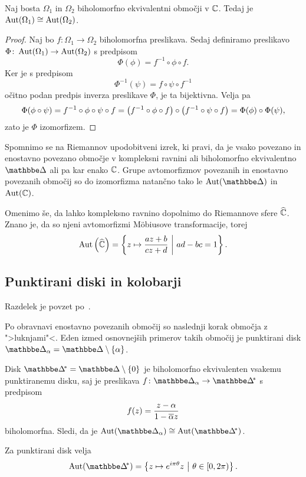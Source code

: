 \begin{lema}
Naj bosta $\Omega_1$ in $\Omega_2$ biholomorfno ekvivalentni
območji v $\mathbb{C}$. Tedaj je $\operatorname{Aut}(\Omega_1) \cong \operatorname{Aut}(\Omega_2)$.
\end{lema}

\begin{proof}
Naj bo $f \colon \Omega_1 \to \Omega_2$ biholomorfna preslikava.
Sedaj definiramo preslikavo
$\Phi \colon \operatorname{Aut}(\Omega_1) \to \operatorname{Aut}(\Omega_2)$ s predpisom
\[
\Phi(\phi) = f^{-1} \circ \phi \circ f.
\]
Ker je s predpisom
\[
\Phi^{-1}(\psi) = f \circ \psi \circ f^{-1}
\]
očitno podan predpis inverza preslikave $\Phi$, je ta bijektivna.
Velja pa
\[
\Phi(\phi \circ \psi) = f^{-1} \circ \phi \circ \psi \circ f =
\left(f^{-1} \circ \phi \circ f\right) \circ
\left(f^{-1} \circ \psi \circ f\right) =
\Phi(\phi) \circ \Phi(\psi),
\]
zato je $\Phi$ izomorfizem.
\end{proof}

Spomnimo se na Riemannov upodobitveni izrek, ki pravi, da je
vsako povezano in enostavno povezano območje v kompleksni ravnini
ali biholomorfno ekvivalentno $\dsk$ ali pa kar enako $\mathbb{C}$. Grupe
avtomorfizmov povezanih in enostavno povezanih območij so do
izomorfizma natančno tako le $\Aut(\dsk)$ in $\operatorname{Aut}(\mathbb{C})$.

Omenimo še, da lahko kompleksno ravnino dopolnimo do Riemannove
sfere $\widehat{\mathbb{C}}$. Znano je, da so njeni avtomorfizmi Möbiusove
transformacije, torej
\[
\operatorname{Aut} \left(\widehat{\mathbb{C}}\right) =
\left\{z \mapsto \frac{az + b}{cz + d}~\middle\vert~ad - bc = 1\right\}.
\]

\subsection{Punktirani diski in kolobarji}

Razdelek je povzet po~\cite{cerne}.

Po obravnavi enostavno povezanih območij so naslednji korak
območja z ">luknjami"<. Eden izmed osnovnejših primerov takih
območij je punktirani disk
$\dsk_\alpha = \dsk \setminus \set{\alpha}$.

Disk $\dskx = \dsk \setminus \set{0}$ je biholomorfno
ekvivalenten vsakemu punktiranemu disku, saj je preslikava
$f \colon \dsk_\alpha \to \dskx$ s predpisom
\[
f(z) = \frac{z - \alpha}{1 - \overline{\alpha} z}
\]
biholomorfna. Sledi, da je
$\Aut(\dsk_\alpha) \cong \Aut(\dskx)$.

\begin{trditev}
Za punktirani disk velja
\[
\Aut(\dskx) =
\setb{z \mapsto e^{i \pi \theta} z}{\theta \in [0, 2\pi)}.
\]
\end{trditev}

